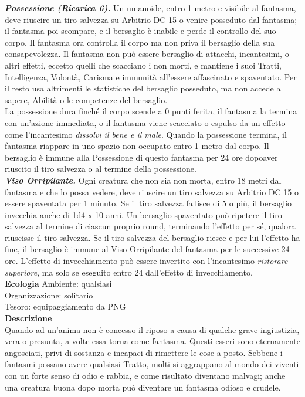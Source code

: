 \begin{multicols}{2}
\emph{\textbf{Possessione (Ricarica 6).}} Un umanoide, entro 1 metro e visibile al fantasma, deve riuscire un tiro salvezza su Arbitrio DC  15 o venire posseduto dal fantasma; il fantasma poi scompare, e il bersaglio è inabile e perde il controllo del suo corpo. Il fantasma ora controlla il corpo ma non priva il bersaglio della sua consapevolezza. Il fantasma non può essere bersaglio di attacchi, incantesimi, o altri effetti, eccetto quelli che scacciano i non morti, e mantiene i suoi Tratti, Intelligenza, Volontà, Carisma e immunità all'essere affascinato e spaventato. Per il resto usa altrimenti le statistiche del bersaglio posseduto, ma non accede al sapere, Abilità o le competenze del bersaglio.\\
La possessione dura finché il corpo scende a 0 punti ferita, il fantasma la termina con un'azione immediata, o il fantasma viene scacciato o espulso da un effetto come l'incantesimo \emph{dissolvi il bene e il male}. Quando la possessione termina, il fantasma riappare in uno spazio non occupato entro 1 metro dal corpo. Il bersaglio è immune alla Possessione di questo fantasma per 24 ore dopoaver riuscito il tiro  salvezza o al termine della possessione.\\

\emph{\textbf{Viso Orripilante.}} Ogni creatura che non sia non morta, entro 18 metri  dal fantasma e che lo possa vedere, deve riuscire un tiro salvezza su Arbitrio DC  15 o essere spaventata per 1 minuto. Se il tiro salvezza  fallisce di 5 o più, il bersaglio invecchia anche di 1d4 x 10 anni. Un  bersaglio spaventato può ripetere il tiro salvezza al termine di ciascun  proprio round, terminando l'effetto per sé, qualora riuscisse il tiro  salvezza. Se il tiro salvezza del bersaglio riesce e per lui l'effetto ha fine, il  bersaglio è immune al Viso Orripilante del fantasma per le successive 24  ore. L'effetto di invecchiamento può essere invertito con l'incantesimo \emph{ristorare superiore}, ma solo se eseguito entro 24 dall'effetto di invecchiamento.\\
\textbf{Ecologia}
Ambiente: qualsiasi\\
Organizzazione: solitario\\
Tesoro: equipaggiamento da PNG\\
\textbf{Descrizione}\\
Quando ad un’anima non è concesso il riposo a causa di qualche grave ingiustizia, vera o presunta, a volte essa torna come fantasma. Questi esseri sono eternamente angosciati, privi di sostanza e incapaci di rimettere le cose a posto. Sebbene i fantasmi possano avere qualsiasi Tratto, molti si aggrappano al mondo dei viventi con un forte senso di odio e rabbia, e come risultato diventano  malvagi; anche una creatura buona dopo morta può diventare un fantasma odioso e crudele.\\


\end{multicols}
